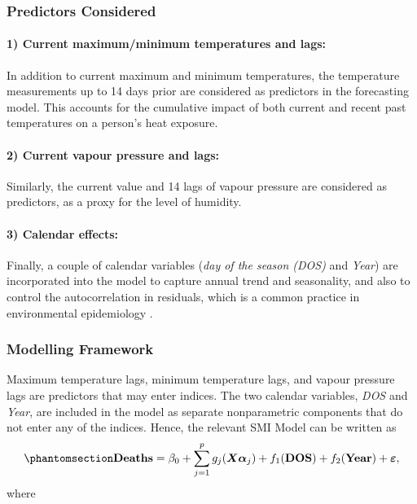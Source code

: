 \documentclass[
  11pt,
  a4paper,
]{article}
\begin{document}
\subsubsection{Predictors Considered}\label{predictors-considered}

\paragraph{1) Current maximum/minimum temperatures and
lags:}\label{current-maximumminimum-temperatures-and-lags}

In addition to current maximum and minimum temperatures, the temperature
measurements up to 14 days prior are considered as predictors in the
forecasting model. This accounts for the cumulative impact of both
current and recent past temperatures on a person's heat exposure.

\paragraph{2) Current vapour pressure and
lags:}\label{current-vapour-pressure-and-lags}

Similarly, the current value and 14 lags of vapour pressure are
considered as predictors, as a proxy for the level of humidity.

\paragraph{3) Calendar effects:}\label{calendar-effects}

Finally, a couple of calendar variables (\emph{day of the season (DOS)}
and \emph{Year}) are incorporated into the model to capture annual trend
and seasonality, and also to control the autocorrelation in residuals,
which is a common practice in environmental epidemiology
\autocite{Masselot2022}.

\subsubsection{Modelling Framework}\label{modelling-framework}

Maximum temperature lags, minimum temperature lags, and vapour pressure
lags are predictors that may enter indices. The two calendar variables,
\emph{DOS} and \emph{Year}, are included in the model as separate
nonparametric components that do not enter any of the indices. Hence,
the relevant SMI Model can be written as
\begin{equation}\phantomsection\label{eq-heat}{
  \textbf{Deaths} = \beta_{0} + \sum_{j = 1}^{p}{g_{j}(\bm{X}\bm{\alpha}_{j})} + f_{1}(\textbf{DOS}) + f_{2}(\textbf{Year})+ \bm{\varepsilon},
}\end{equation} where
\end{document}

